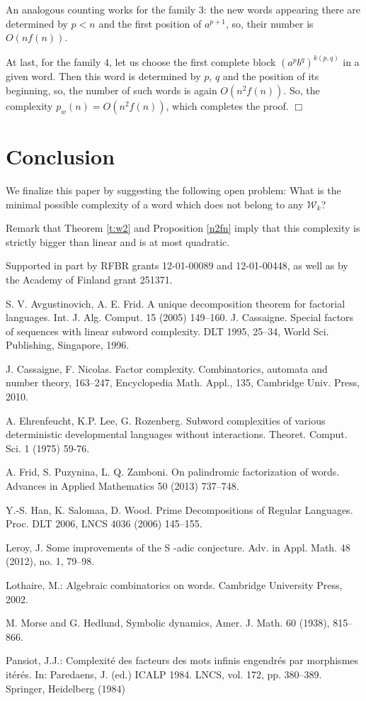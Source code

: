 \documentclass[runningheads,envcountsect,envcountsame]{llncs}
\begin{document}
An analogous counting works for the family 3: the new words
appearing there are determined by $p<n$ and the first position of
$a^{p+1}$, so, their number is $O(nf(n))$.

At last, for the family 4, let us choose the first complete block $(a^{p}b^{q})^{k(p,q)}$ in a given word. Then this word is determined by $p$, $q$ and the position of its beginning, so, the number of such words is again $O(n^2 f(n))$.
\fi
So, the complexity $p_w(n)=O(n^2f(n))$, which completes the proof. \hfill $\Box$


\section{Conclusion}

We finalize this paper by suggesting the following open problem: What is the minimal possible complexity of a word which does not
belong to any $\mathcal W_k$?

Remark that Theorem \ref{t:w2} and Proposition \ref{n2fn} imply
that this complexity is strictly bigger than linear and is at most
quadratic.

\medskip
Supported in part by RFBR grants 12-01-00089 and  12-01-00448, as well as by the Academy of Finland grant 251371.


\begin{thebibliography}{10}
S. V. Avgustinovich, A. E. Frid. A unique decomposition theorem for factorial languages. Int. J. Alg. Comput. 15 (2005) 149--160.
J. Cassaigne.
Special factors of sequences with linear subword complexity.
DLT 1995, 25--34, World Sci. Publishing, Singapore, 1996.

J. Cassaigne, F. Nicolas.
Factor complexity.
Combinatorics, automata and number theory, 163--247, Encyclopedia Math. Appl., 135, Cambridge Univ. Press, 2010.

 A. Ehrenfeucht, K.P. Lee, G. Rozenberg.
Subword complexities of various deterministic developmental languages without interactions.
Theoret. Comput. Sci. 1 (1975) 59-76.

 A. Frid, S. Puzynina, L. Q. Zamboni. On palindromic factorization of words. Advances in Applied Mathematics 50 (2013) 737--748.

Y.-S. Han, K. Salomaa, D. Wood. Prime Decompositions of Regular Languages. Proc. DLT 2006, LNCS 4036 (2006) 145--155.

  Leroy, J. Some improvements of the S -adic conjecture. Adv. in Appl. Math. 48 (2012), no. 1, 79--98.

Lothaire, M.: Algebraic combinatorics on words. Cambridge
University Press, 2002.

 M. Morse and G. Hedlund, Symbolic dynamics,
Amer. J. Math. 60 (1938),  815--866.

Pansiot, J.J.: Complexit\'{e} des facteurs des mots infinis engendr\'{e}s
par morphismes it\'{e}r\'{e}s. In: Paredaens, J. (ed.) ICALP 1984. LNCS,
vol. 172, pp. 380--389. Springer, Heidelberg (1984)
\end{thebibliography}
\end{document}
